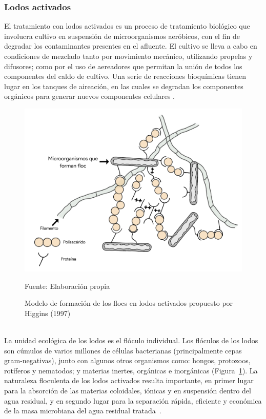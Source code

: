 \subsubsection*{Lodos activados}
El tratamiento con lodos activados es un proceso de tratamiento biológico que involucra cultivo en suspensión de microorganismos aeróbicos, con el fin de degradar los contaminantes presentes en el afluente. El cultivo se lleva a cabo en condiciones de mezclado tanto por movimiento mecánico, utilizando propelas y difusores; como por el uso de aereadores que permitan la unión de todos los componentes del caldo de cultivo. Una serie de reacciones bioquímicas tienen lugar en los tanques de aireación, en las cuales se degradan los componentes orgánicos para generar nuevos componentes celulares \emph{\citep{ashok16}}.
	\begin{figure}[!h]
		\centering
		\includegraphics[scale=0.15]{Floculo.png}
		\caption{Modelo de formación de los flocs en lodos activados propuesto por Higgins (1997)}
		\small{Fuente: Elaboración propia}
		\label{fig:modfloc}
	\end{figure}
\\La unidad ecológica de los lodos es el flóculo individual. Los flóculos de los lodos son cúmulos de varios millones de células bacterianas (principalmente cepas gram-negativas), junto con algunos otros organismos como: hongos, protozoos, rotíferos y nematodos; y materias inertes, orgánicas e inorgánicas (Figura~\ref{fig:modfloc}). La naturaleza floculenta de los lodos activados resulta importante, en primer lugar para la absorción de las materias coloidales, iónicas y en suspensión dentro del agua residual, y en segundo lugar para la separación rápida, eficiente y económica de la masa microbiana del agua residual tratada~\emph{\citep{ashok16}}.\\ 
